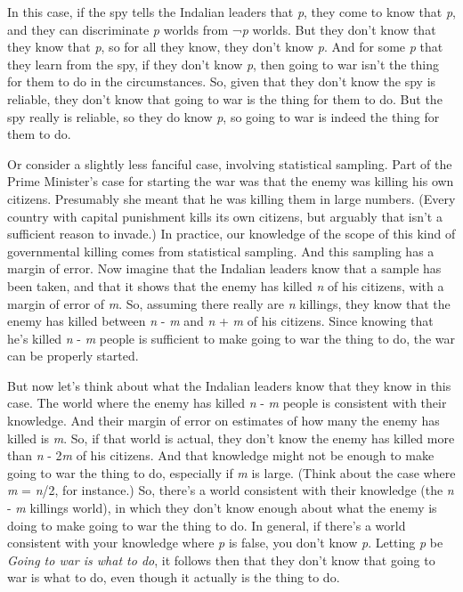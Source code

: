 \documentclass[
  10pt,
  letterpaper,
  DIV=11,
  numbers=noendperiod,
  twoside]{scrartcl}
\begin{document}
In this case, if the spy tells the Indalian leaders that \emph{p}, they
come to know that \emph{p}, and they can discriminate \emph{p} worlds
from ¬\emph{p} worlds. But they don't know that they know that \emph{p},
so for all they know, they don't know \emph{p}. And for some \emph{p}
that they learn from the spy, if they don't know \emph{p}, then going to
war isn't the thing for them to do in the circumstances. So, given that
they don't know the spy is reliable, they don't know that going to war
is the thing for them to do. But the spy really is reliable, so they do
know \emph{p}, so going to war is indeed the thing for them to do.

Or consider a slightly less fanciful case, involving statistical
sampling. Part of the Prime Minister's case for starting the war was
that the enemy was killing his own citizens. Presumably she meant that
he was killing them in large numbers. (Every country with capital
punishment kills its own citizens, but arguably that isn't a sufficient
reason to invade.) In practice, our knowledge of the scope of this kind
of governmental killing comes from statistical sampling. And this
sampling has a margin of error. Now imagine that the Indalian leaders
know that a sample has been taken, and that it shows that the enemy has
killed \emph{n} of his citizens, with a margin of error of \emph{m}. So,
assuming there really are \emph{n} killings, they know that the enemy
has killed between \emph{n} - \emph{m} and \emph{n} + \emph{m} of his
citizens. Since knowing that he's killed \emph{n} - \emph{m} people is
sufficient to make going to war the thing to do, the war can be properly
started.

But now let's think about what the Indalian leaders know that they know
in this case. The world where the enemy has killed \emph{n} - \emph{m}
people is consistent with their knowledge. And their margin of error on
estimates of how many the enemy has killed is \emph{m}. So, if that
world is actual, they don't know the enemy has killed more than \emph{n}
- 2\emph{m} of his citizens. And that knowledge might not be enough to
make going to war the thing to do, especially if \emph{m} is large.
(Think about the case where \emph{m} = \emph{n}/2, for instance.) So,
there's a world consistent with their knowledge (the \emph{n} - \emph{m}
killings world), in which they don't know enough about what the enemy is
doing to make going to war the thing to do. In general, if there's a
world consistent with your knowledge where \emph{p} is false, you don't
know \emph{p}. Letting \emph{p} be \emph{Going to war is what to do}, it
follows then that they don't know that going to war is what to do, even
though it actually is the thing to do.
\end{document}
